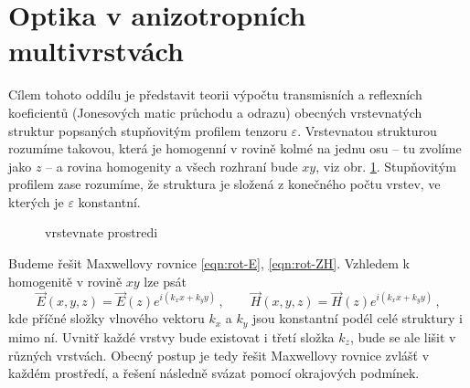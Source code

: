 \section{Optika v anizotropních multivrstvách}
\label{chap:optika-v-multivrstvach}

Cílem tohoto oddílu je představit teorii výpočtu transmisních a reflexních koeficientů (Jonesových matic průchodu a odrazu) obecných vrstevnatých struktur popsaných stupňovitým profilem tenzoru $\varepsilon$.
Vrstevnatou strukturou rozumíme takovou, která je homogenní v rovině kolmé na jednu osu -- tu zvolíme jako $z$ -- a rovina homogenity a všech rozhraní bude $xy$, viz obr. \ref{fig:vrstevnate-prostredi}.
Stupňovitým profilem zase rozumíme, že struktura je složená z konečného počtu vrstev, ve kterých je $\varepsilon$ konstantní.

\begin{figure}[htbp]
    \centering
    \caption{vrstevnate prostredi}
    \label{fig:vrstevnate-prostredi}
\end{figure}

Budeme řešit Maxwellovy rovnice \eqref{eqn:rot-E}, \eqref{eqn:rot-ZH}.
Vzhledem k homogenitě v rovině $xy$ lze psát
\begin{equation} 
\label{eqn:pricne-vlnove-vektory}
    \vec{E}(x,y,z)=\vec{E}(z) e^{i(k_xx+k_yy)} \,, \qquad \vec{H}(x,y,z)=\vec{H}(z) e^{i(k_xx+k_yy)} \,,
\end{equation}
kde příčné složky vlnového vektoru $k_x$ a $k_y$ jsou konstantní podél celé struktury i mimo ní.
Uvnitř každé vrstvy bude existovat i třetí složka $k_z$, bude se ale lišit v různých vrstvách.
Obecný postup je tedy řešit Maxwellovy rovnice zvlášť v každém prostředí, a řešení následně svázat pomocí okrajových podmínek.
 
